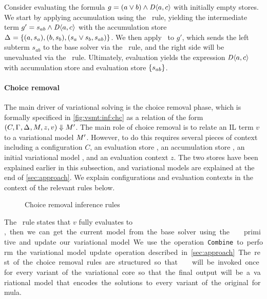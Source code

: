 Consider evaluating the formula $g=(a\vee b)\wedge\chc[D]{a,c}$ with initially
empty stores. We start by applying accumulation using the \evAcc\ rule,
yielding the intermediate term $g'=s_{ab}\wedge\chc[D]{a,c}$ with the
accumulation store $\aStore{}=\set{(a,s_a),(b,s_b),(s_a \vee s_b,s_{ab})}$. We
then apply \evAndL\ to $g'$, which sends the left subterm $s_{ab}$ to the base
solver via the \evSym\ rule, and the right side will be unevaluated via the
\evChc\ rule.
%
Ultimately, evaluation yields the expression $\chc[D]{a,c}$ with accumulation
store \aStore{} and evaluation store $\set{s_{ab}}$.


\paragraph{Choice removal}
%
The main driver of variational solving is the choice removal phase, which is
formally specificed in \autoref{fig:vsmt:inf:chc} as a relation of the form
$(C,\Gamma_{},\Delta_{},M_{},z,v)\Downarrow M_{}'$.
%
The main role of choice removal is to relate an IL term $v$ to a variational
model $M_{}'$. However, to do this requires several pieces of context
including a configuration $C$, an evaluation store \eStore{}, an accumulation
store \aStore{}, an initial variational model \vmodel{}, and an evaluation
context $z$. The two stores have been explained earlier in this subsection, and
variational models are explained at the end of \autoref{sec:approach}. We
explain configurations and evaluation contexts in the context of the relevant
rules below.


\begin{figure}
  
  \caption{Choice removal inference rules}%
  \label{fig:vsmt:inf:chc}
\end{figure}


The \crEval\ rule states that $v$ fully evaluates to \unit, then we can get the
current model from the base solver using the \pmodel\ primitive and update our
variational model. We use the operation \texttt{Combine} to perform the
variational model update operation described in \autoref{sec:approach}.
%
The rest of the choice removal rules are structured so that \crEval\ will be
invoked once for every variant of the variational core so that the final output
will be a variational model that encodes the solutions to every variant of the
original formula.


